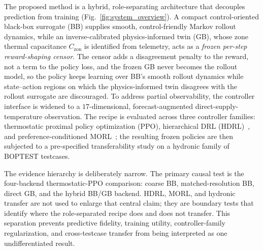 \documentclass[a4paper,fleqn]{cas-sc}
\newcommand{\Czon}{\ensuremath{C_{\mathrm{zon}}}}
\begin{document}
The proposed method is a hybrid, role-separating architecture that decouples prediction from training (Fig.~\ref{fig:system_overview}). A compact control-oriented black-box surrogate (BB) supplies smooth, control-friendly Markov rollout dynamics, while an inverse-calibrated physics-informed twin (GB), whose zone thermal capacitance $\Czon$ is identified from telemetry, acts as a \emph{frozen per-step reward-shaping censor}. The censor adds a disagreement penalty to the reward, not a term to the policy loss, and the frozen GB never becomes the rollout model, so the policy keeps learning over BB's smooth rollout dynamics while state--action regions on which the physics-informed twin disagrees with the rollout surrogate are discouraged. To address partial observability, the controller interface is widened to a $17$-dimensional, forecast-augmented direct-supply-temperature observation. The recipe is evaluated across three controller families: thermostatic proximal policy optimization (PPO), hierarchical DRL (HDRL)~\citep{Liao2025HDRL}, and preference-conditioned MORL~\citep{Byeon2025MaxMinMORL}; the resulting frozen policies are then subjected to a pre-specified transferability study on a hydronic family of BOPTEST testcases.

The evidence hierarchy is deliberately narrow. The primary causal test is the four-backend thermostatic-PPO comparison: coarse BB, matched-resolution BB, direct GB, and the hybrid BB/GB backend. HDRL, MORL, and hydronic transfer are not used to enlarge that central claim; they are boundary tests that identify where the role-separated recipe does and does not transfer. This separation prevents predictive fidelity, training utility, controller-family regularization, and cross-testcase transfer from being interpreted as one undifferentiated result.
\end{document}
